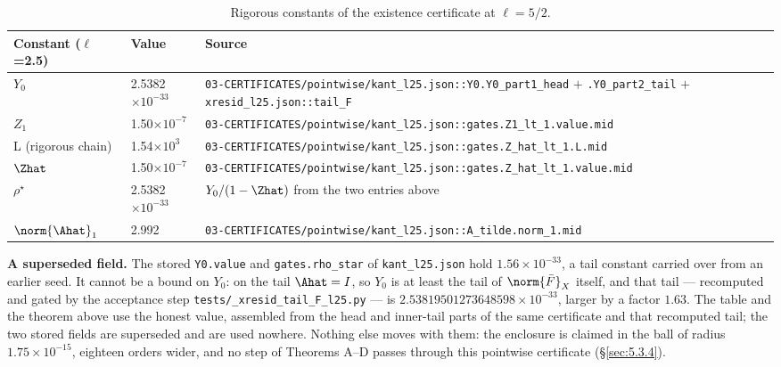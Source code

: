 \begin{table}[htbp]
\centering
\small
\caption{Rigorous constants of the existence certificate at $\ell=5/2$.}
\label{tab:5.3.3-constants}
\begin{tabular}{p{} p{} p{}}
\toprule
Constant ($\ell$=2.5) & Value & Source \\
\midrule
$Y_0$ & 2.5382$\times 10^{-33}$ & \texttt{03-\allowbreak CERTIFICATES/\allowbreak pointwise/\allowbreak kant\_\allowbreak l25.json\allowbreak ::\allowbreak Y0.\allowbreak Y0\_\allowbreak part1\_\allowbreak head} $+$ \texttt{.Y0\_\allowbreak part2\_\allowbreak tail} $+$ \texttt{xresid\_\allowbreak l25.json\allowbreak ::\allowbreak tail\_\allowbreak F} \\
$Z_1$ & 1.50$\times 10^{-7}$ & \texttt{03-\allowbreak CERTIFICATES/\allowbreak pointwise/\allowbreak kant\_\allowbreak l25.json\allowbreak ::\allowbreak gates.Z1\_\allowbreak lt\_\allowbreak 1.value.mid} \\
L (rigorous chain) & 1.54$\times 10^{3}$ & \texttt{03-\allowbreak CERTIFICATES/\allowbreak pointwise/\allowbreak kant\_\allowbreak l25.json\allowbreak ::\allowbreak gates.Z\_\allowbreak hat\_\allowbreak lt\_\allowbreak 1.L.mid} \\
$\Zhat$ & 1.50$\times 10^{-7}$ & \texttt{03-\allowbreak CERTIFICATES/\allowbreak pointwise/\allowbreak kant\_\allowbreak l25.json\allowbreak ::\allowbreak gates.Z\_\allowbreak hat\_\allowbreak lt\_\allowbreak 1.value.mid} \\
$\rho^{\star}$ & 2.5382$\times 10^{-33}$ & $Y_0/(1-\Zhat)$ from the two entries above \\
$\norm{\Ahat}_1$ & 2.992 &
\texttt{03-\allowbreak CERTIFICATES/\allowbreak pointwise/\allowbreak kant\_\allowbreak l25.json\allowbreak ::\allowbreak A\_\allowbreak tilde.norm\_\allowbreak 1.mid} \\
\bottomrule
\end{tabular}
\end{table}

\noindent\textbf{A superseded field.} The stored \texttt{Y0.value} and
\texttt{gates.\allowbreak rho\_\allowbreak star} of
\texttt{kant\_\allowbreak l25.json} hold $1.56\times10^{-33}$, a tail constant
carried over from an earlier seed. It cannot be a bound on $Y_0$: on the tail
$\Ahat = I$, so $Y_0$ is at least the tail of $\norm{\bar F}_X$ itself, and
that tail --- recomputed and gated by the acceptance step
\texttt{tests/\allowbreak \_\allowbreak xresid\_\allowbreak tail\_\allowbreak F\_\allowbreak l25.py}
--- is $2.53819501273648598\times10^{-33}$, larger by a factor $1.63$. The
table and the theorem above use the honest value, assembled from the head and
inner-tail parts of the same certificate and that recomputed tail; the two
stored fields are superseded and are used nowhere. Nothing else moves with
them: the enclosure is claimed in the ball of radius $1.75\times10^{-15}$,
eighteen orders wider, and no step of Theorems A--D passes through this
pointwise certificate (\S\ref{sec:5.3.4}).

